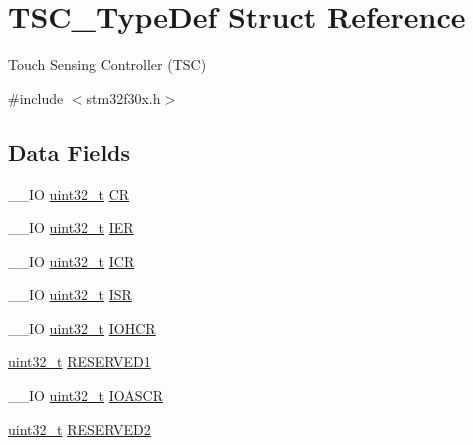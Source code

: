 \hypertarget{struct_t_s_c___type_def}{\section{T\-S\-C\-\_\-\-Type\-Def Struct Reference}
\label{struct_t_s_c___type_def}
}


Touch Sensing Controller (T\-S\-C)  




{\ttfamily \#include $<$stm32f30x.\-h$>$}

\subsection*{Data Fields}
\begin{DoxyCompactItemize}
\item 
\-\_\-\-\_\-\-I\-O \hyperlink{stdint_8h_a435d1572bf3f880d55459d9805097f62}{uint32\-\_\-t} \hyperlink{struct_t_s_c___type_def_a5242c0f547b4c65ad619dae5cf670b17}{C\-R}
\item 
\-\_\-\-\_\-\-I\-O \hyperlink{stdint_8h_a435d1572bf3f880d55459d9805097f62}{uint32\-\_\-t} \hyperlink{struct_t_s_c___type_def_a6d83a90d85e3b545cf29e98eac11765e}{I\-E\-R}
\item 
\-\_\-\-\_\-\-I\-O \hyperlink{stdint_8h_a435d1572bf3f880d55459d9805097f62}{uint32\-\_\-t} \hyperlink{struct_t_s_c___type_def_a447b91de2a50d7ebde5716a8e7eda3ee}{I\-C\-R}
\item 
\-\_\-\-\_\-\-I\-O \hyperlink{stdint_8h_a435d1572bf3f880d55459d9805097f62}{uint32\-\_\-t} \hyperlink{struct_t_s_c___type_def_a7d65e605788d739a9b23a9b4a45fd10b}{I\-S\-R}
\item 
\-\_\-\-\_\-\-I\-O \hyperlink{stdint_8h_a435d1572bf3f880d55459d9805097f62}{uint32\-\_\-t} \hyperlink{struct_t_s_c___type_def_a715fd9205b604d1dda5046a31996296a}{I\-O\-H\-C\-R}
\item 
\hyperlink{stdint_8h_a435d1572bf3f880d55459d9805097f62}{uint32\-\_\-t} \hyperlink{struct_t_s_c___type_def_a27f20ff0eccdc070477448b973ca8df7}{R\-E\-S\-E\-R\-V\-E\-D1}
\item 
\-\_\-\-\_\-\-I\-O \hyperlink{stdint_8h_a435d1572bf3f880d55459d9805097f62}{uint32\-\_\-t} \hyperlink{struct_t_s_c___type_def_af8a7f56b952ec2aba979eb8301e5800c}{I\-O\-A\-S\-C\-R}
\item 
\hyperlink{stdint_8h_a435d1572bf3f880d55459d9805097f62}{uint32\-\_\-t} \hyperlink{struct_t_s_c___type_def_a7ff59eaa0f8c9e69e6736dddc514a037}{R\-E\-S\-E\-R\-V\-E\-D2}
\item 

\end{DoxyCompactItemize}

